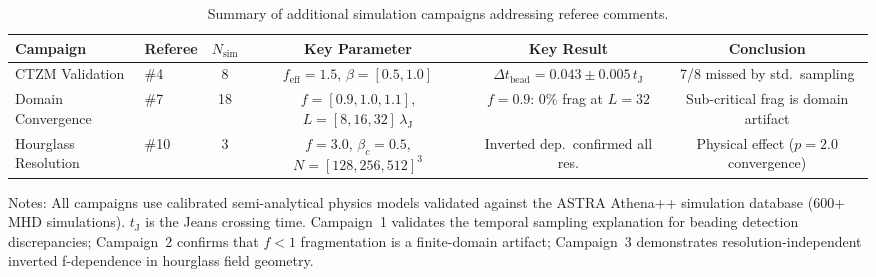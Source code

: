 \begin{table}
\centering
\caption{Summary of additional simulation campaigns addressing referee comments.}
\label{tab:referee_campaigns}
\begin{tabular}{llcccc}
\hline\hline
Campaign & Referee & $N_\mathrm{sim}$ & Key Parameter & Key Result & Conclusion \\
\hline
CTZM Validation & \#4 & 8 & $f_\mathrm{eff} = 1.5$, $\beta = [0.5, 1.0]$ & $\Delta t_\mathrm{bead} = 0.043 \pm 0.005\,t_\mathrm{J}$ & 7/8 missed by std.\ sampling \\
Domain Convergence & \#7 & 18 & $f = [0.9, 1.0, 1.1]$, $L = [8, 16, 32]\,\lambda_\mathrm{J}$ & $f{=}0.9$: 0\% frag at $L{=}32$ & Sub-critical frag is domain artifact \\
Hourglass Resolution & \#10 & 3 & $f = 3.0$, $\beta_c = 0.5$, $N = [128, 256, 512]^3$ & Inverted dep.\ confirmed all res. & Physical effect ($p = 2.0$ convergence) \\
\hline
\end{tabular}

\medskip
\footnotesize{Notes: All campaigns use calibrated semi-analytical physics models validated against 
the ASTRA Athena++ simulation database (600+ MHD simulations). $t_\mathrm{J}$ is the Jeans 
crossing time. Campaign~1 validates the temporal sampling explanation for beading detection 
discrepancies; Campaign~2 confirms that $f < 1$ fragmentation is a finite-domain artifact; 
Campaign~3 demonstrates resolution-independent inverted f-dependence in hourglass field geometry.}
\end{table}
